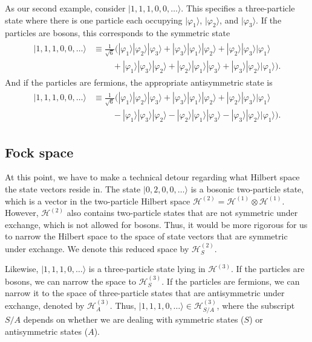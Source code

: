 \documentclass[pra,12pt]{revtex4}
\begin{document}
As our second example, consider $|1,1,1,0,0,\dots\rangle$.  This
specifies a three-particle state where there is one particle each
occupying $|\varphi_1\rangle$, $|\varphi_2\rangle$, and
$|\varphi_3\rangle$.  If the particles are bosons, this corresponds to
the symmetric state
\begin{align}
  \begin{aligned}|1,1,1,0,0,\dots\rangle &\equiv \frac{1}{\sqrt{6}}\Big(|\varphi_1\rangle|\varphi_2\rangle|\varphi_3\rangle + |\varphi_3\rangle|\varphi_1\rangle|\varphi_2\rangle + |\varphi_2\rangle|\varphi_3\rangle|\varphi_1\rangle \\&\;\qquad+ |\varphi_1\rangle|\varphi_3\rangle|\varphi_2\rangle + |\varphi_2\rangle|\varphi_1\rangle|\varphi_3\rangle + |\varphi_3\rangle|\varphi_2\rangle|\varphi_1\rangle \Big).
  \end{aligned}
\end{align}
And if the particles are fermions, the appropriate antisymmetric state
is
\begin{align}
  \begin{aligned}|1,1,1,0,0,\dots\rangle &\equiv \frac{1}{\sqrt{6}} \Big(|\varphi_1\rangle|\varphi_2\rangle|\varphi_3\rangle + |\varphi_3\rangle|\varphi_1\rangle|\varphi_2\rangle + |\varphi_2\rangle|\varphi_3\rangle|\varphi_1\rangle \\&\;\qquad - |\varphi_1\rangle|\varphi_3\rangle|\varphi_2\rangle - |\varphi_2\rangle|\varphi_1\rangle|\varphi_3\rangle - |\varphi_3\rangle|\varphi_2\rangle|\varphi_1\rangle\Big).
  \end{aligned}
\end{align}

\subsection{Fock space}

At this point, we have to make a technical detour regarding what
Hilbert space the state vectors reside in.  The state
$|0,2,0,0,\dots\rangle$ is a bosonic two-particle state, which is a
vector in the two-particle Hilbert space $\mathscr{H}^{(2)} =
\mathscr{H}^{(1)}\otimes \mathscr{H}^{(1)}$.  However,
$\mathscr{H}^{(2)}$ also contains two-particle states that are not
symmetric under exchange, which is not allowed for bosons.  Thus, it
would be more rigorous for us to narrow the Hilbert space to the space
of state vectors that are symmetric under exchange.  We denote this
reduced space by $\mathscr{H}^{(2)}_S$.

Likewise, $|1,1,1,0,\dots\rangle$ is a three-particle state lying in
$\mathscr{H}^{(3)}$.  If the particles are bosons, we can narrow the
space to $\mathscr{H}^{(3)}_S$.  If the particles are fermions, we can
narrow it to the space of three-particle states that are antisymmetric
under exchange, denoted by $\mathscr{H}^{(3)}_A$.  Thus,
$|1,1,1,0,\dots\rangle \in \mathscr{H}^{(3)}_{S/A}$, where the
subscript $S/A$ depends on whether we are dealing with symmetric
states ($S$) or antisymmetric states ($A$).
\end{document}
